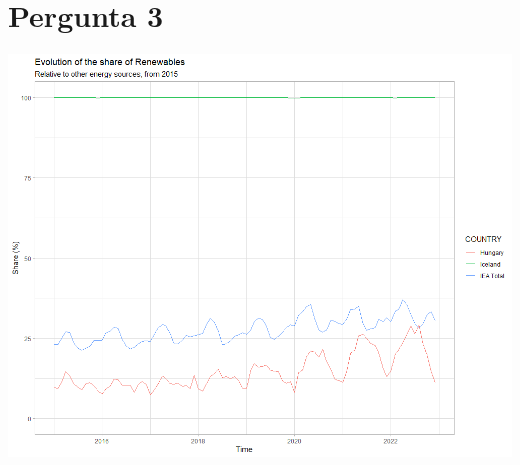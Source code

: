 \documentclass[11pt,a4paper]{article}
\begin{document}
\pagestyle{fancy}

\section*{Pergunta 3}



\vspace{20pt}

\begin{center}
  \includegraphics[width=\linewidth]{pergunta_3.png}
\end{center}
\end{document}
